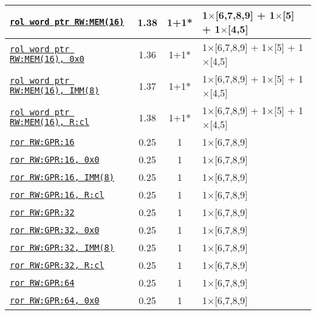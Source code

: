 \documentclass[a4paper,english,fontsize=9]{scrartcl}
\begin{document}
\begin{longtable}{p{}ccL{.25\textwidth}}
  \midrule
  \texttt{\href{https://felixcloutier.com/x86/RCL:RCR:ROL:ROR.html}{rol word ptr RW:MEM(16)}} & 1.38 & 1+1* & 1\(\times\)[6,7,8,9] + 1\(\times\)[5] + 1\(\times\)[4,5] \\
  \midrule
  \texttt{\href{https://felixcloutier.com/x86/RCL:RCR:ROL:ROR.html}{rol word ptr RW:MEM(16), 0x0}} & 1.36 & 1+1* & 1\(\times\)[6,7,8,9] + 1\(\times\)[5] + 1\(\times\)[4,5] \\
  \midrule
  \texttt{\href{https://felixcloutier.com/x86/RCL:RCR:ROL:ROR.html}{rol word ptr RW:MEM(16), IMM(8)}} & 1.37 & 1+1* & 1\(\times\)[6,7,8,9] + 1\(\times\)[5] + 1\(\times\)[4,5] \\
  \midrule
  \texttt{\href{https://felixcloutier.com/x86/RCL:RCR:ROL:ROR.html}{rol word ptr RW:MEM(16), R:cl}} & 1.38 & 1+1* & 1\(\times\)[6,7,8,9] + 1\(\times\)[5] + 1\(\times\)[4,5] \\
  \midrule
  \texttt{\href{https://felixcloutier.com/x86/RCL:RCR:ROL:ROR.html}{ror RW:GPR:16}} & 0.25 & 1 & 1\(\times\)[6,7,8,9] \\
  \midrule
  \texttt{\href{https://felixcloutier.com/x86/RCL:RCR:ROL:ROR.html}{ror RW:GPR:16, 0x0}} & 0.25 & 1 & 1\(\times\)[6,7,8,9] \\
  \midrule
  \texttt{\href{https://felixcloutier.com/x86/RCL:RCR:ROL:ROR.html}{ror RW:GPR:16, IMM(8)}} & 0.25 & 1 & 1\(\times\)[6,7,8,9] \\
  \midrule
  \texttt{\href{https://felixcloutier.com/x86/RCL:RCR:ROL:ROR.html}{ror RW:GPR:16, R:cl}} & 0.25 & 1 & 1\(\times\)[6,7,8,9] \\
  \midrule
  \texttt{\href{https://felixcloutier.com/x86/RCL:RCR:ROL:ROR.html}{ror RW:GPR:32}} & 0.25 & 1 & 1\(\times\)[6,7,8,9] \\
  \midrule
  \texttt{\href{https://felixcloutier.com/x86/RCL:RCR:ROL:ROR.html}{ror RW:GPR:32, 0x0}} & 0.25 & 1 & 1\(\times\)[6,7,8,9] \\
  \midrule
  \texttt{\href{https://felixcloutier.com/x86/RCL:RCR:ROL:ROR.html}{ror RW:GPR:32, IMM(8)}} & 0.25 & 1 & 1\(\times\)[6,7,8,9] \\
  \midrule
  \texttt{\href{https://felixcloutier.com/x86/RCL:RCR:ROL:ROR.html}{ror RW:GPR:32, R:cl}} & 0.25 & 1 & 1\(\times\)[6,7,8,9] \\
  \midrule
  \texttt{\href{https://felixcloutier.com/x86/RCL:RCR:ROL:ROR.html}{ror RW:GPR:64}} & 0.25 & 1 & 1\(\times\)[6,7,8,9] \\
  \midrule
  \texttt{\href{https://felixcloutier.com/x86/RCL:RCR:ROL:ROR.html}{ror RW:GPR:64, 0x0}} & 0.25 & 1 & 1\(\times\)[6,7,8,9] \\

\end{longtable}
\end{document}
